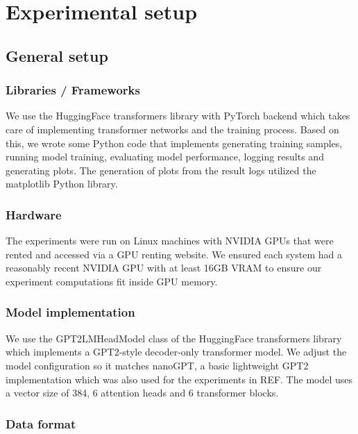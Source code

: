 \section{Experimental setup}

\subsection{General setup}

\subsubsection{Libraries / Frameworks}

We use the HuggingFace transformers library with PyTorch backend which takes care of implementing transformer networks and the training process. Based on this, we wrote some Python code that implements generating training samples, running model training, evaluating model performance, logging results and generating plots. The generation of plots from the result logs utilized the matplotlib Python library.

\subsubsection{Hardware}
\label{expsetup:hardware}

The experiments were run on Linux machines with NVIDIA GPUs that were rented and accessed via a GPU renting website. We ensured each system had a reasonably recent NVIDIA GPU with at least 16GB VRAM to ensure our experiment computations fit inside GPU memory.

\subsubsection{Model implementation}

We use the GPT2LMHeadModel class of the HuggingFace transformers library which implements a GPT2-style decoder-only transformer model.
We adjust the model configuration so it matches nanoGPT, a basic lightweight GPT2 implementation which was also used for the experiments in REF. 
The model uses a vector size of 384, 6 attention heads and 6 transformer blocks.



\subsubsection{Data format}

